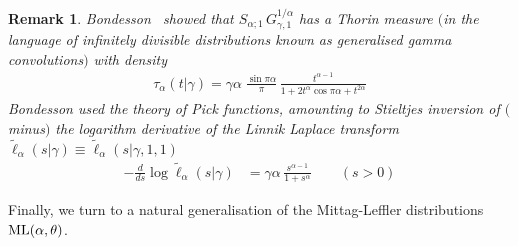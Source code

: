 \documentclass[a4paper,12pt]{article}
\newtheorem{remark}{Remark}
\begin{document}
{{{\begin{remark}
Bondesson~{\rm \cite[3.2.4(p38)]{Bondesson}} showed that   $S_{\alpha;1}\, G_{\gamma, 1}^{1/\alpha}$  has
a Thorin measure $($in the language of infinitely divisible distributions known as generalised gamma convolutions$)$
with density
\begin{align*}
 \tau_\alpha(t\vert \gamma) %
 = \gamma\alpha \; \frac{\sin\pi\alpha}{\pi} \, \frac{t^{\alpha-1}}{1+2  t^\alpha\cos\pi\alpha+t^{2\alpha}}
\end{align*}
Bondesson used the  theory of Pick functions,  amounting to  Stieltjes inversion of $($minus$)$ the 
logarithm derivative of the Linnik Laplace transform 
$\widetilde \ell_\alpha(s\vert \gamma) \equiv \widetilde \ell_\alpha(s\vert  \gamma,1,1)$ %
\begin{align*}
-\frac{d}{ds}\log \widetilde \ell_\alpha(s\vert \gamma)
&= \gamma  \alpha \, \frac{ s^{\alpha-1}}{1+  s^\alpha} \qquad (s>0)
\end{align*}
\end{remark}

Finally, we turn to a natural generalisation of the Mittag-Leffler distributions  ${\rm ML}(\alpha,\theta)$. 
 
}}}
\end{document}
